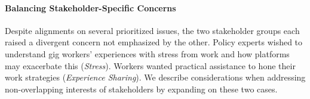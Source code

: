

\paragraph{{Balancing Stakeholder-Specific Concerns}}
{Despite alignments on several prioritized issues, the two stakeholder groups each raised a divergent concern not emphasized by the other.
Policy experts wished to understand gig workers' experiences with stress from work and how platforms may exacerbate this (\textit{Stress}). Workers wanted practical assistance to hone their work strategies (\textit{Experience Sharing}). We describe considerations when addressing non-overlapping interests of stakeholders by expanding on these two cases.}


